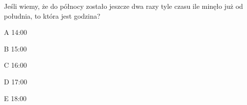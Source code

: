 \begin{tresc}
Jeśli wiemy, że do północy zostało jeszcze dwa razy tyle czasu ile minęło już od południa, to która jest godzina?
\end{tresc}
\begin{wariant}{A} 14:00 \end{wariant}
\begin{wariant}{B} 15:00 \end{wariant}
\begin{wariant}{C} 16:00 \end{wariant}
\begin{wariant}{D} 17:00 \end{wariant}
\begin{wariant}{E} 18:00 \end{wariant}
